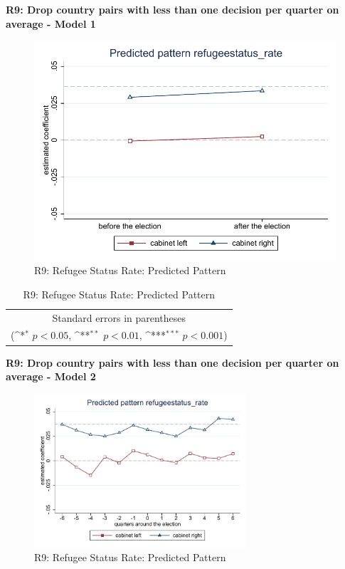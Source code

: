 \documentclass[10pt,a4paper]{scrartcl}
\begin{document}
\clearpage
\textbf{R9: Drop country pairs with less than one decision per quarter on average - Model 1}
\begin{figure}[!ht]
	\centering
	\includegraphics[width=1\textwidth]{figures_edited/refugeestatus_rate_graph1_R9.pdf}
	\caption{R9: Refugee Status Rate: Predicted Pattern}
\end{figure}

\begin{table}[!ht]\centering
	\renewcommand{\arraystretch}{1.25}
	\def\sym#1{\ifmmode^{#1}\else\(^{#1}\)\fi}
	\caption{R9: Refugee Status Rate: Predicted Pattern}
	\begin{tabular}{l*{2}{c}}
		\hline\hline
		
		\hline\hline
		\multicolumn{3}{c}{\footnotesize Standard errors in parentheses} \\
		\multicolumn{3}{c}{\footnotesize (\sym{*} \(p<0.05\), \sym{**} \(p<0.01\), \sym{***} \(p<0.001\))}\\
	\end{tabular}
\end{table}

\clearpage
\textbf{R9: Drop country pairs with less than one decision per quarter on average - Model 2}
\begin{figure}[!ht]
	\centering
	\includegraphics[width=0.7\textwidth]{figures_edited/refugeestatus_rate_graph2_R9.pdf}
	\caption{R9: Refugee Status Rate: Predicted Pattern}
\end{figure}
\end{document}
